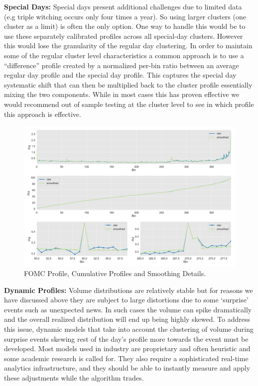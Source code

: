 \noindent\textbf{Special Days:} Special days present additional challenges due to limited data (e.g triple witching occurs only four times a year). So using larger clusters (one cluster as a limit) is often the only option. One way to handle this would be to use these separately calibrated profiles across all special-day clusters. However this would lose the granularity of the regular day clustering. In order to maintain some of the  regular cluster level characteristics a common approach is to use a ``difference'' profile created by a normalized per-bin ratio between an average regular day profile and the special day profile. This captures the special day systematic shift that can then be multiplied back to the cluster profile essentially mixing the two components. While in most cases this has proven effective we would recommend out of sample testing at the cluster level to see in which profile this approach is effective. \label{in:norm2} \twomedskip

	\begin{figure}[!ht]
	\centering
	\includegraphics[width=\textwidth]{chapters/chapter_trade_data_models/figures/fomc_profile.png} 
	\caption{FOMC Profile, Cumulative Profiles and Smoothing Details.\label{fig:fomc_profile}}
	\end{figure}


\noindent\textbf{Dynamic Profiles:} Volume distributions are relatively stable but for reasons we have discussed above they are subject to large distortions due to some `surprise' events such as unexpected news. In such cases the volume can spike dramatically and the overall realized distribution will end up being highly skewed. To address this issue, dynamic models that take into account the clustering of volume during surprise events skewing rest of the day's profile more towards the event must be developed. Most models used in industry are proprietary and often heuristic and some academic research is called for. They also require a sophisticated real-time analytics infrastructure, and they should be able to instantly measure and apply these adjustments while the algorithm trades.


